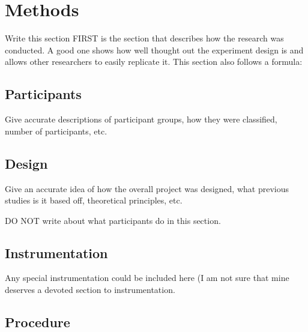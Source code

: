
\section{Methods}

Write this section FIRST
is the section that describes how the research was conducted. A good one shows how well thought out the experiment design is and allows other researchers to easily replicate it. This section also follows a formula:

\subsection{Participants}

Give accurate descriptions of participant groups, how they were classified, number of participants, etc.


\subsection{Design}

Give an accurate idea of how the overall project was designed, what previous studies is it based off, theoretical principles, etc.

DO NOT write about what participants do in this section.

\subsection{Instrumentation}

Any special instrumentation could be included here (I am not sure that mine deserves a devoted section to instrumentation.



\subsection{Procedure}

